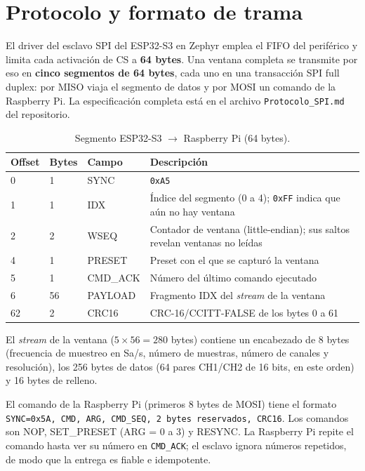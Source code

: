 \documentclass[12pt,a4paper]{article}
\begin{document}
\section{Protocolo y formato de trama}

El driver del esclavo SPI del ESP32-S3 en Zephyr emplea el FIFO del periférico y limita cada activación de CS a \textbf{64 bytes}. Una ventana completa se transmite por eso en \textbf{cinco segmentos de 64 bytes}, cada uno en una transacción SPI full duplex: por MISO viaja el segmento de datos y por MOSI un comando de la Raspberry Pi. La especificación completa está en el archivo \texttt{Protocolo\_SPI.md} del repositorio.

\begin{table}[H]
\centering
\small
\begin{tabular}{@{}p{1.6cm} p{1.4cm} p{2.4cm} p{6.4cm}@{}}
\toprule
\textbf{Offset} & \textbf{Bytes} & \textbf{Campo} & \textbf{Descripción} \\
\midrule
0  & 1  & SYNC    & \texttt{0xA5} \\
1  & 1  & IDX     & Índice del segmento (0 a 4); \texttt{0xFF} indica que aún no hay ventana \\
2  & 2  & WSEQ    & Contador de ventana (little-endian); sus saltos revelan ventanas no leídas \\
4  & 1  & PRESET  & Preset con el que se capturó la ventana \\
5  & 1  & CMD\_ACK & Número del último comando ejecutado \\
6  & 56 & PAYLOAD & Fragmento IDX del \emph{stream} de la ventana \\
62 & 2  & CRC16   & CRC-16/CCITT-FALSE de los bytes 0 a 61 \\
\bottomrule
\end{tabular}
\caption{Segmento ESP32-S3 $\rightarrow$ Raspberry Pi (64 bytes).}
\end{table}

El \emph{stream} de la ventana ($5 \times 56 = 280$ bytes) contiene un encabezado de 8 bytes (frecuencia de muestreo en Sa/s, número de muestras, número de canales y resolución), los 256 bytes de datos (64 pares CH1/CH2 de 16 bits, en este orden) y 16 bytes de relleno.

El comando de la Raspberry Pi (primeros 8 bytes de MOSI) tiene el formato \texttt{SYNC=0x5A, CMD, ARG, CMD\_SEQ, 2 bytes reservados, CRC16}. Los comandos son NOP, SET\_PRESET (ARG = 0 a 3) y RESYNC. La Raspberry Pi repite el comando hasta ver su número en \texttt{CMD\_ACK}; el esclavo ignora números repetidos, de modo que la entrega es fiable e idempotente.
\end{document}
